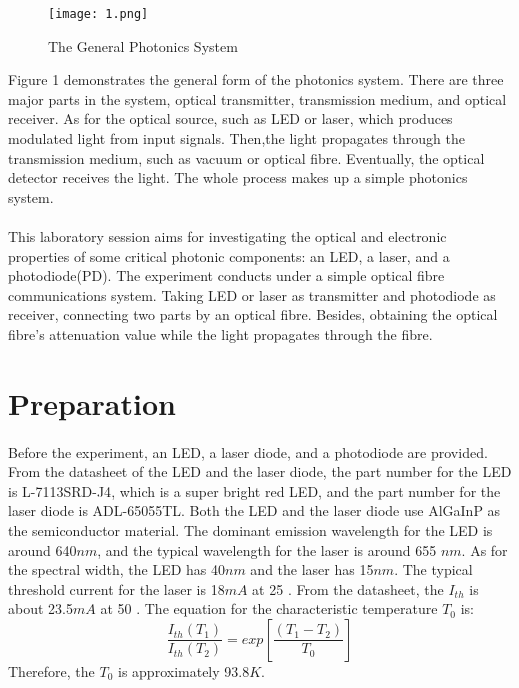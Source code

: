 \documentclass[12pt]{article}
\begin{document}
    \begin{figure}[H]
    \centering
    \texttt{[image: 1.png]}
    \caption{The General Photonics System}
    \end{figure}
    Figure 1 demonstrates the general form of the photonics system. There are three major parts in the system, optical transmitter, transmission medium, and optical receiver. As for the optical source, such as LED or laser, which produces modulated light from input signals. Then,the light propagates through the transmission medium, such as vacuum or optical fibre. Eventually, the optical detector receives the light\cite{2}. The whole process makes up a simple photonics system.
    
    \paragraph{}
    This laboratory session aims for investigating the optical and electronic properties of some critical photonic components: an LED, a laser, and a photodiode(PD). The experiment conducts under a simple optical fibre communications system. Taking LED or laser as transmitter and photodiode as receiver, connecting two parts by an optical fibre. Besides, obtaining the optical fibre's attenuation value while the light propagates through the fibre.
    
    
    \section{Preparation}
    \paragraph{}
    Before the experiment, an LED, a laser diode, and a photodiode are provided. From the datasheet of the LED and the laser diode, the part number for the LED is L-7113SRD-J4\cite{3}, which is a super bright red LED, and the part number for the laser diode is ADL-65055TL\cite{4}. Both the LED and the laser diode use AlGaInP as the semiconductor material. The dominant emission wavelength for the LED is around 640$nm$, and the typical wavelength for the laser is around 655 $nm$. As for the spectral width, the LED has 40$nm$ and the laser has 15$nm$. The typical threshold current for the laser is 18$mA$ at 25 \textcelsius{}. From the datasheet, the $I_{th}$ is about 23.5$mA$ at 50 \textcelsius{}. The equation for the characteristic temperature $T_{0}$ is:
    \begin{equation}
        \frac{I_{th}(T_{1})}{I_{th}(T_{2})}=exp\left[ \frac{\left ( T_{1}- T_{2}\right )}{T_{0}}\right ]
    \end{equation}
    Therefore, the $T_{0}$ is approximately 93.8$K$.
    
\end{document}
